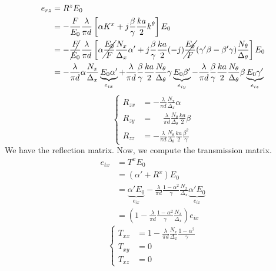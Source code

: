 \begin{align*}
    e_{rz} &= R^z E_0
    \\
    &=
    -
    \frac{F}{E_0}
    \frac{\lambda}{\pi d}
    \left[
        \alpha K^x
        +
        j
        \frac{\beta}{\gamma}
        \frac{ka}{2}
        k^\theta
    \right]
    E_0
    \\
    &=
    -
    \cancel{\frac{F}{E_0}}
    \frac{\lambda}{\pi d}
    \left[
        \alpha
        \cancel{\frac{E_0}{F}}
        \frac{N_x}{\Delta_x}
        \alpha'
        +
        j
        \frac{\beta}{\gamma}
        \frac{ka}{2}
        (-j)
        \cancel{\frac{E_0}{F}}
        (\gamma' \beta - \beta' \gamma)
        \frac{N_\theta}{\Delta_\theta}
    \right]
    E_0
    \\
    &=
    -
    \frac{\lambda}{\pi d}
    \alpha
    \frac{N_x}{\Delta_x}
    \underbrace{E_0 \alpha'}_{e_{ix}}
    +
    \frac{\lambda}{\pi d}
    \frac{\beta}{\gamma}
    \frac{ka}{2}
    \frac{N_\theta}{\Delta_\theta}
    \gamma
    \underbrace{E_0 \beta'}_{e_{iy}}
    -
    \frac{\lambda}{\pi d}
    \frac{\beta}{\gamma}
    \frac{ka}{2}
    \frac{N_\theta}{\Delta_\theta}
    \beta
    \underbrace{E_0 \gamma'}_{e_{iz}}
\end{align*}
\begin{equation}
    \left\lbrace
    \begin{aligned}
        R_{zx}
        &=
        -
        \frac{\lambda}{\pi d}
        \frac{N_x}{\Delta_x}
        \alpha
        \\
        R_{zy}
        &=
        \phantom{-}
        \frac{\lambda}{\pi d}
        \frac{N_\theta}{\Delta_\theta}
        \frac{ka}{2}
        \beta
        \\
        R_{zz}
        &=
        -
        \frac{\lambda}{\pi d}
        \frac{N_\theta}{\Delta_\theta}
        \frac{ka}{2}
        \frac{\beta^2}{\gamma}
    \end{aligned}
    \right.
\end{equation}
We have the reflection matrix.
Now, we compute the transmission matrix.
\begin{align*}
    e_{tx} &= T^x E_0
    \\
    &= (\alpha' + R^x) E_0
    \\
    &= \underbrace{\alpha' E_0}_{e_{ix}}
       -
       \frac{\lambda}{\pi d}
       \frac{1 - \alpha^2}{\gamma}
       \frac{N_x}{\Delta_x}
       \underbrace{\alpha' E_0}_{e_{ix}}
    \\
    &= \left(
           1
           -
           \frac{\lambda}{\pi d}
           \frac{1 - \alpha^2}{\gamma}
           \frac{N_x}{\Delta_x}
       \right)
       e_{ix}
\end{align*}
\begin{equation}
    \left\lbrace
    \begin{aligned}
        T_{xx}
        &= 1
           -
           \frac{\lambda}{\pi d}
           \frac{N_x}{\Delta_x}
           \frac{1 - \alpha^2}{\gamma}
        \\
        T_{xy} &= 0
        \\
        T_{xz} &= 0
    \end{aligned}
    \right.
\end{equation}

